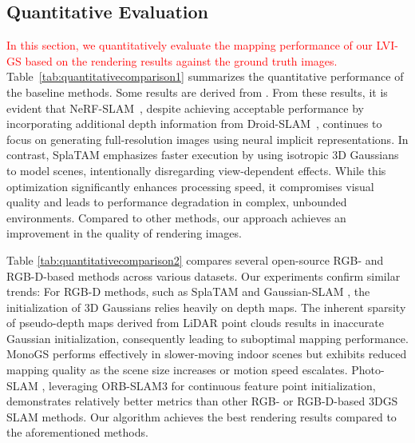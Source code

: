 \documentclass[lettersize,journal]{IEEEtran}
\begin{document}
\subsection{Quantitative Evaluation}
\label{subsec:quantitativeevaluation}
\textcolor{red}{In this section, we quantitatively evaluate the mapping performance of our LVI-GS based on the rendering results against the ground truth images.}
Table~\ref{tab:quantitativecomparison1} summarizes the quantitative performance of the baseline methods. 
Some results are derived from \cite{gaussianlic}. From these results, it is evident that NeRF-SLAM~\cite{nerfslam}, despite achieving acceptable performance by incorporating additional depth information from Droid-SLAM~\cite{droidslam}, continues to focus on generating full-resolution images using neural implicit representations. In contrast, SplaTAM \cite{splatam} emphasizes faster execution by using isotropic 3D Gaussians to model scenes, intentionally disregarding view-dependent effects. While this optimization significantly enhances processing speed, it compromises visual quality and leads to performance degradation in complex, unbounded environments. Compared to other methods, our approach achieves an improvement in the quality of rendering images.

Table \ref{tab:quantitativecomparison2} compares several open-source RGB- and RGB-D-based methods across various datasets. Our experiments confirm similar trends: For RGB-D methods, such as SplaTAM \cite{splatam} and Gaussian-SLAM \cite{gaussianslam}, the initialization of 3D Gaussians relies heavily on depth maps. The inherent sparsity of pseudo-depth maps derived from LiDAR point clouds results in inaccurate Gaussian initialization, consequently leading to suboptimal mapping performance. MonoGS performs effectively in slower-moving indoor scenes but exhibits reduced mapping quality as the scene size increases or motion speed escalates. Photo-SLAM \cite{photoslam}, leveraging ORB-SLAM3 \cite{orbslam3} for continuous feature point initialization, demonstrates relatively better metrics than other RGB- or RGB-D-based 3DGS SLAM methods. Our algorithm achieves the best rendering results compared to the aforementioned methods.
\end{document}
